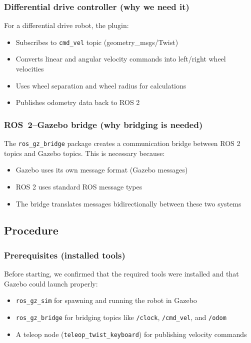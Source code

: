\subsubsection{Differential drive controller (why we need it)}

For a differential drive robot, the plugin:
\begin{itemize}
	\item Subscribes to \texttt{cmd\_vel} topic (geometry\_msgs/Twist)
	\item Converts linear and angular velocity commands into left/right wheel velocities
	\item Uses wheel separation and wheel radius for calculations
	\item Publishes odometry data back to ROS 2
\end{itemize}

\subsubsection{ROS~2--Gazebo bridge (why bridging is needed)}

The \texttt{ros\_gz\_bridge} package creates a communication bridge between ROS 2 topics and Gazebo topics. This is necessary because:
\begin{itemize}
	\item Gazebo uses its own message format (Gazebo messages)
	\item ROS 2 uses standard ROS message types
	\item The bridge translates messages bidirectionally between these two systems
\end{itemize}

\subsection{Procedure}

\subsubsection{Prerequisites (installed tools)}

Before starting, we confirmed that the required tools were installed and that Gazebo could launch properly:
\begin{itemize}
	\item \texttt{ros\_gz\_sim} for spawning and running the robot in Gazebo
	\item \texttt{ros\_gz\_bridge} for bridging topics like \texttt{/clock}, \texttt{/cmd\_vel}, and \texttt{/odom}
	\item A teleop node (\texttt{teleop\_twist\_keyboard}) for publishing velocity commands
\end{itemize}

